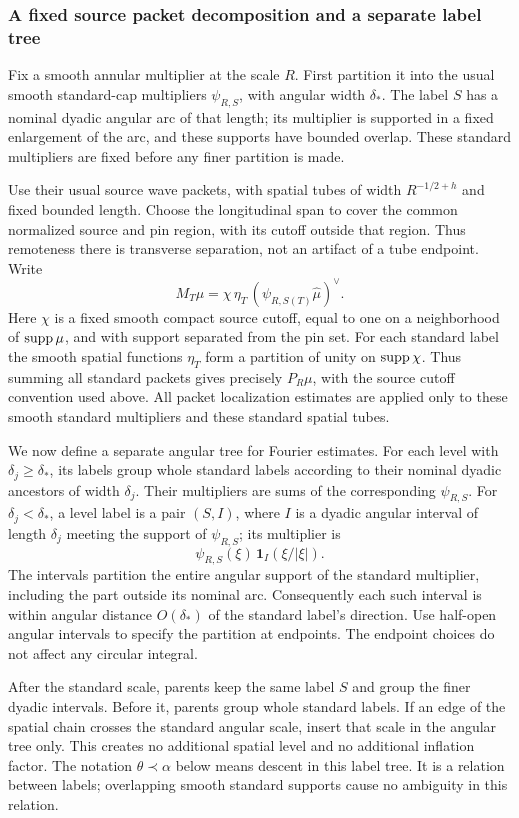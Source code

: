 \subsubsection*{A fixed source packet decomposition and a separate label tree}

Fix a smooth annular multiplier at the scale \(R\). First partition it
into the usual smooth standard-cap multipliers \(\psi_{R,S}\), with
angular width \(\delta_*\). The label \(S\) has a nominal dyadic angular
arc of that length; its multiplier is supported in a fixed enlargement
of the arc, and these supports have bounded overlap. These standard
multipliers are fixed before any finer partition is made.

Use their usual source wave packets, with spatial tubes of width
\(R^{-1/2+h}\) and fixed bounded length. Choose the longitudinal span
to cover the common normalized source and pin region, with its cutoff
outside that region. Thus remoteness there is transverse separation,
not an artifact of a tube endpoint. Write
$$
 M_T\mu=\chi\,\eta_T\,(\psi_{R,S(T)}\widehat\mu)^\vee.
$$
Here \(\chi\) is a fixed smooth compact source cutoff, equal to one on
a neighborhood of \(\operatorname{supp}\mu\), and with support separated from the pin
set. For each standard label the smooth spatial functions \(\eta_T\)
form a partition of unity on \(\operatorname{supp}\chi\). Thus summing all standard
packets gives precisely \(P_R\mu\), with the source cutoff convention
used above. All packet localization estimates are applied only to these
smooth standard multipliers and these standard spatial tubes.

We now define a separate angular tree for Fourier estimates. For each
level with \(\delta_j\geq\delta_*\), its labels group whole standard
labels according to their nominal dyadic ancestors of width \(\delta_j\).
Their multipliers are sums of the corresponding \(\psi_{R,S}\).
For \(\delta_j<\delta_*\), a level label is a pair \((S,I)\), where
\(I\) is a dyadic angular interval of length \(\delta_j\) meeting the
support of \(\psi_{R,S}\); its multiplier is
$$
 \psi_{R,S}(\xi)\,\mathbf 1_I(\xi/|\xi|).
$$
The intervals partition the entire angular support of the standard
multiplier, including the part outside its nominal arc. Consequently
each such interval is within angular distance \(O(\delta_*)\) of the
standard label's direction. Use half-open angular intervals to specify
the partition at endpoints. The endpoint choices do not affect any
circular integral.

After the standard scale, parents keep the same label \(S\) and group
the finer dyadic intervals. Before it, parents group whole standard
labels. If an edge of the spatial chain crosses the standard angular
scale, insert that scale in the angular tree only. This creates no
additional spatial level and no additional inflation factor.
The notation \(\theta\prec\alpha\) below means descent in this label
tree. It is a relation between labels; overlapping smooth standard
supports cause no ambiguity in this relation.

